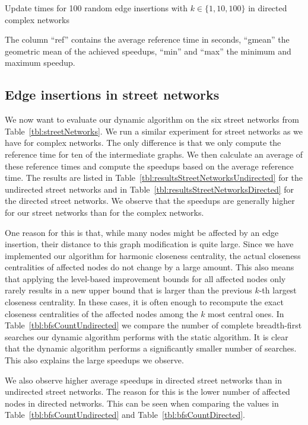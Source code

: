 \begin{landscape}
\begin{table}[h]
\caption{Update times for 100 random edge insertions with  $k \in \{1, 10, 100\}$ in directed complex networks}{The column ``ref'' contains the average reference time in seconds, ``gmean'' the geometric mean of the achieved speedups, ``min'' and ``max'' the minimum and maximum speedup.}
\label{tbl:topkDirectedComplex}
\end{table}
\end{landscape}

\subsection{Edge insertions in street networks}
\label{sec:evaluationEdgeInsertionsStreetNetworks}
We now want to evaluate our dynamic algorithm on the six street networks from Table~\ref{tbl:streetNetworks}. We run a similar experiment for street networks as we have for complex networks. The only difference is that we only compute the reference time for ten of the intermediate graphs. We then calculate an average of these reference times and compute the speedups based on the average reference time. The results are listed in Table~\ref{tbl:resultsStreetNetworksUndirected} for the undirected street networks and in Table~\ref{tbl:resultsStreetNetworksDirected} for the directed street networks. We observe that the speedups are generally higher for our street networks than for the complex networks.

One reason for this is that, while many nodes might be affected by an edge insertion, their distance to this graph modification is quite large. Since we have implemented our algorithm for harmonic closeness centrality, the actual closeness centralities of affected nodes do not change by a large amount. This also means that applying the level-based improvement bounds for all affected nodes only rarely results in a new upper bound that is larger than the previous $k$-th largest closeness centrality. In these cases, it is often enough to recompute the exact closeness centralities of the affected nodes among the $k$ most central ones. In Table~\ref{tbl:bfsCountUndirected} we compare the number of complete breadth-first searches our dynamic algorithm performs with the static algorithm. It is clear that the dynamic algorithm performs a significantly smaller number of searches. This also explains the large speedups we observe.

We also observe higher average speedups in directed street networks than in undirected street networks. The reason for this is the lower number of affected nodes in directed networks. This can be seen when comparing the values in Table~\ref{tbl:bfsCountUndirected} and Table~\ref{tbl:bfsCountDirected}.

